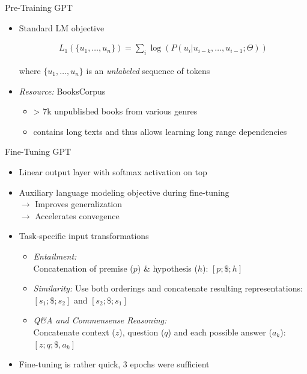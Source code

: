 
\begin{vbframe}{Pre-Training GPT}

\vfill

\begin{itemize}
		\item Standard LM objective

\begin{align*}
	L_1(\{u_1, \hdots, u_n\}) = \sum_i \log(P(u_i | u_{i-k}, \hdots, u_{i-1}; \Theta))
\end{align*}
					
					where $\{u_1, \hdots, u_n\}$ is an \textit{unlabeled} sequence of tokens

		\item \textit{Resource:} BooksCorpus 
			\begin{itemize}
				\item > 7k unpublished books from various genres
				\item contains long texts and thus allows learning long range dependencies
			\end{itemize}
\end{itemize}

\vfill

\end{vbframe}


\begin{vbframe}{Fine-Tuning GPT}

\vfill
			
\begin{itemize}
		\item Linear output layer with softmax activation on top
		\item Auxiliary language modeling objective during fine-tuning\\
					$\rightarrow$ Improves generalization\\
					$\rightarrow$ Accelerates convegence
		\item Task-specific input transformations
					\begin{itemize}
						\item \textit{Entailment:} \\ Concatenation of premise ($p$) \& hypothesis ($h$): $[p; \$; h]$
						\item \textit{Similarity:} Use both orderings and concatenate resulting representations: $[s_1; \$; s_2]$ and $[s_2; \$; s_1]$
						\item \textit{Q\&A and Commensense Reasoning:} \\ Concatenate context ($z$), question ($q$) and each possible answer ($a_k$): $[z; q; \$, a_k]$
					\end{itemize}
		\item Fine-tuning is rather quick, 3 epochs were sufficient
\end{itemize}

\vfill

\end{vbframe}

